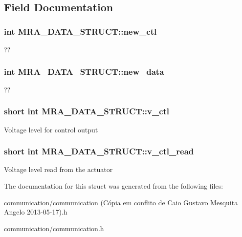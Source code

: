 \subsection{Field Documentation}
\hypertarget{structMRA__DATA__STRUCT_a5b1af89ee717f5b14c18e8ac12e93e75}{
\subsubsection[{new\_\-ctl}]{\setlength{\rightskip}{0pt plus 5cm}int {\bf MRA\_\-DATA\_\-STRUCT::new\_\-ctl}}}
\label{structMRA__DATA__STRUCT_a5b1af89ee717f5b14c18e8ac12e93e75}
?? \hypertarget{structMRA__DATA__STRUCT_afca6e851d302f3a786885a4e1eec79d7}{
\subsubsection[{new\_\-data}]{\setlength{\rightskip}{0pt plus 5cm}int {\bf MRA\_\-DATA\_\-STRUCT::new\_\-data}}}
\label{structMRA__DATA__STRUCT_afca6e851d302f3a786885a4e1eec79d7}
?? \hypertarget{structMRA__DATA__STRUCT_a64b4e6bb604e58de593a60c87942b966}{
\subsubsection[{v\_\-ctl}]{\setlength{\rightskip}{0pt plus 5cm}short int {\bf MRA\_\-DATA\_\-STRUCT::v\_\-ctl}}}
\label{structMRA__DATA__STRUCT_a64b4e6bb604e58de593a60c87942b966}
Voltage level for control output \hypertarget{structMRA__DATA__STRUCT_a3a31d57268c33b21ac915fdc27dfe474}{
\subsubsection[{v\_\-ctl\_\-read}]{\setlength{\rightskip}{0pt plus 5cm}short int {\bf MRA\_\-DATA\_\-STRUCT::v\_\-ctl\_\-read}}}
\label{structMRA__DATA__STRUCT_a3a31d57268c33b21ac915fdc27dfe474}
Voltage level read from the actuator 

The documentation for this struct was generated from the following files:\begin{DoxyCompactItemize}
\item 
communication/communication (Cópia em conflito de Caio Gustavo Mesquita Angelo 2013-\/05-\/17).h\item 
communication/communication.h\end{DoxyCompactItemize}

